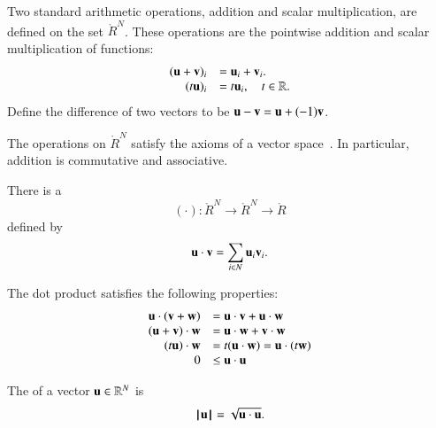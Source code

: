 \begin{definition}
Two standard arithmetic operations, addition and scalar multiplication, are defined on
the set $\ring{R}^N$.  These operations are  the pointwise addition 
and scalar multiplication of functions:
    \begin{equation}
      \begin{array}{rll}
    ({\mathbf u} + {\mathbf v})_i &= {\mathbf u}_i + {\mathbf v}_i.\\
    (t {\mathbf u})_i &= t {\mathbf u}_i,\quad t\in\mathbb{R}.\\
    \end{array}
    \end{equation}
%
%
Define the difference of two vectors to be ${\mathbf u} - {\mathbf v} = {\mathbf u} + (-1) {\mathbf v}$.
%
\end{definition}
The operations on $\ring{R}^N$ 
satisfy the axioms of a vector space~\cite{unknown}. %
In particular, addition is commutative and associative.


\begin{definition}\label{def:dot}
There is a 
$$(\cdot):\ring{R}^N\to\ring{R}^N\to\ring{R}$$ defined by
    $${\mathbf u}\cdot {\mathbf v} = \sum_{i\in N} {\mathbf u}_i {\mathbf v}_i.$$
%
%
\end{definition}


The dot product satisfies the following
properties:
    \begin{equation}\label{eqn:dot}
    \begin{array}{rll}
        {\mathbf u} \cdot ({\mathbf v} + {\mathbf w}) &= {\mathbf u} \cdot {\mathbf v} + {\mathbf u} \cdot {\mathbf w}\\
        ({\mathbf u} + {\mathbf v})\cdot {\mathbf w} &= {\mathbf u} \cdot {\mathbf w} + {\mathbf v} \cdot {\mathbf w}\\
        (t {\mathbf u})\cdot {\mathbf w} &= t({\mathbf u} \cdot {\mathbf w}) = {\mathbf u} \cdot (t {\mathbf w})\\
        0 &\le {\mathbf u}\cdot {\mathbf u}\\
    \end{array}
    \end{equation}

\begin{definition}[norm]\label{def:norm}
The  of a vector ${\mathbf u}\in\mathbb{R}^N$ is
$${{\hskip0.1em|\hskip-0.15em|\hskip0.1em}{\mathbf u}{\hskip0.1em|\hskip-0.15em|\hskip0.1em}} = \sqrt{{\mathbf u}\cdot {\mathbf u}}.$$
%
\end{definition}

